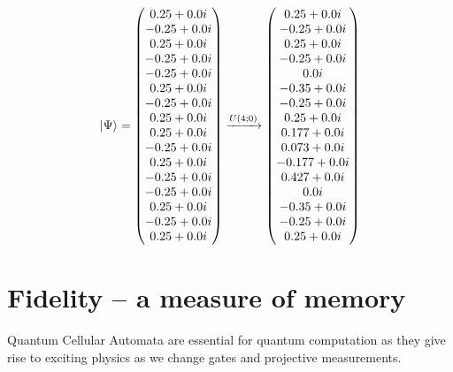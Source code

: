 \documentclass[11pt, oneside, listof=totoc]{scrbook}
\begin{document}
\begin{equation*}
    \ket{\Psi} = \mqty(
    0.25+0.0 i  \\
    -0.25+0.0 i \\
    0.25+0.0 i  \\
    -0.25+0.0 i \\
    -0.25+0.0 i \\
    0.25+0.0 i  \\
    -0.25+0.0 i \\
    0.25+0.0 i  \\
    0.25+0.0 i  \\
    -0.25+0.0 i \\
    0.25+0.0 i  \\
    -0.25+0.0 i \\
    -0.25+0.0 i \\
    0.25+0.0 i  \\
    -0.25+0.0 i \\
    0.25+0.0 i
    ) \xrightarrow{U(4; 0)}
    \mqty(
    0.25+0.0 i \\
    -0.25+0.0 i \\
    0.25+0.0 i \\
    -0.25+0.0 i \\
    0.0 i \\
    -0.35+0.0 i \\
    -0.25+0.0 i \\
    0.25+0.0 i \\
    0.177+0.0 i \\
    0.073+0.0 i \\
    -0.177+0.0 i \\
    0.427+0.0 i \\
    0.0 i \\
    -0.35+0.0 i \\
    -0.25+0.0 i \\
    0.25+0.0 i \\
    )
\end{equation*}

\section{Fidelity -- a measure of memory}

Quantum Cellular Automata are essential for quantum computation as they give rise to exciting physics as we change gates and projective measurements.
\begin{definition}[Fidelity]

\end{definition}
\end{document}
